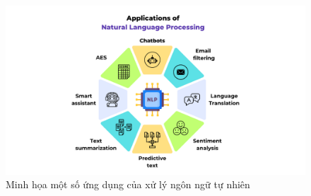 \begin{figure}[htb]
    \centering
    \includegraphics[width=\textwidth]{image/applications-of-nlp.png}
    \caption{Minh họa một số ứng dụng của xử lý ngôn ngữ tự nhiên \cite{webpage26}}
    \label{fig:applications-of-nlp}
\end{figure}

